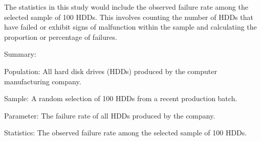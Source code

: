 \documentclass[
]{article}
\begin{document}
The statistics in this study would include the observed failure rate
among the selected sample of 100 HDDs. This involves counting the number
of HDDs that have failed or exhibit signs of malfunction within the
sample and calculating the proportion or percentage of failures.

Summary:

Population: All hard disk drives (HDDs) produced by the computer
manufacturing company.

Sample: A random selection of 100 HDDs from a recent production batch.

Parameter: The failure rate of all HDDs produced by the company.

Statistics: The observed failure rate among the selected sample of 100
HDDs.
\end{document}
